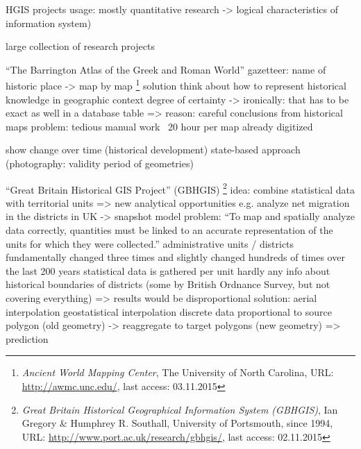 

HGIS projects
  usage: mostly quantitative research
  -> logical characteristics of information system)

  large collection of research projects
  \cite{knowles2008placing}
  \cite{gregory2014toward}

  ``The Barrington Atlas of the Greek and Roman World''
    gazetteer: name of historic place -> map by map
    \cite{talbert2000barrington}
    \footnote{
      \textit{Ancient World Mapping Center},
      The University of North Carolina,
      URL: \url{http://awmc.unc.edu/},
      last access: 03.11.2015
    }
  solution
    think about how to represent historical knowledge in geographic context
    degree of certainty -> ironically: that has to be exact as well in a database table
    => reason: careful conclusions from historical maps
  problem: tedious manual work
    ~20 hour per map already digitized
    \cite[pp. 145]{knowles2002past}

  show change over time (historical development)
  state-based approach (photography: validity period of geometries)

  ``Great Britain Historical GIS Project'' (GBHGIS)
    \footnote{
      \textit{Great Britain Historical Geographical Information System (GBHGIS)},
      Ian Gregory \& Humphrey R. Southall, University of Portsmouth, since 1994,
      URL: \url{http://www.port.ac.uk/research/gbhgis/},
      last access: 02.11.2015
    }
    idea:
      combine statistical data with territorial units
      => new analytical opportunities
      e.g. analyze net migration in the districts in UK
      -> snapshot model
    problem:
      ``To map and spatially analyze data correctly, quantities must be linked to an accurate representation of the units for which they were collected.''
      administrative units / districts fundamentally changed three times and slightly changed hundreds of times over the last 200 years
      statistical data is gathered per unit
      hardly any info about historical boundaries of districts
      (some by British Ordnance Survey, but not covering everything)
      => results would be disproportional
    \cite[pp. 117-129]{knowles2002past}
    solution: aerial interpolation
      geostatistical interpolation
      discrete data proportional to source polygon (old geometry) -> reaggregate to target polygons (new geometry)
      => prediction
      \cite{aerialInterpolation}

